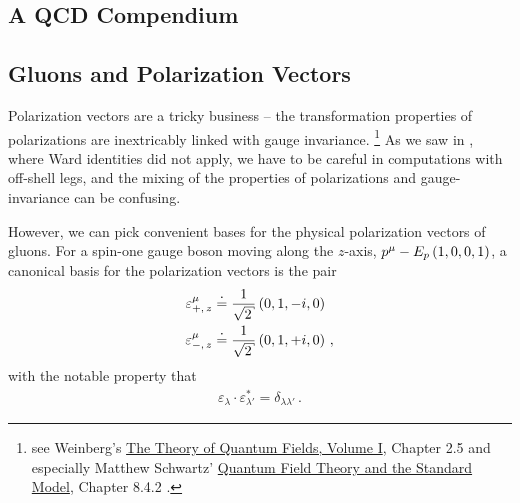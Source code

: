 \begin{subappendices}


\section{A QCD Compendium}
\label{app:qcd-compendium}

\subsection{Gluons and Polarization Vectors}

Polarization vectors are a tricky business -- the transformation properties of polarizations are inextricably linked with gauge invariance.%
\footnote{
    see Weinberg's \underline{The Theory of Quantum Fields, Volume I}, Chapter 2.5 \cite{Weinberg:1995mt} and especially Matthew Schwartz' \underline{Quantum Field Theory and the Standard Model}, Chapter 8.4.2 \cite{Schwartz:2014sze}.
}
%
As we saw in , where Ward identities did not apply, we have to be careful in computations with off-shell legs, and the mixing of the properties of polarizations and gauge-invariance can be confusing.

However, we can pick convenient bases for the physical polarization vectors of gluons.
%
For a spin-one gauge boson moving along the \(z\)-axis, \(p^\mu - E_p \left(1,0,0,1\right)\), a canonical basis for the polarization vectors is the pair
\begin{subequations}
\label{eq:z-polarization}
\begin{align}
    \varepsilon^\mu_{+,\,z}
    &\reppedby
    \frac{1}{\sqrt{2}}
    \le(0, 1, -i, 0\ri)
    \\
    \varepsilon^\mu_{-,\,z}
    &\reppedby
    \frac{1}{\sqrt{2}}
    \le(0, 1, +i, 0\ri)
    \,,
\end{align}
\end{subequations}
with the notable property that
\begin{align}
    \varepsilon_\lambda \cdot \varepsilon_{\lambda'}^*
    =
    \delta_{\lambda \lambda'}
    \,.
\end{align}



\end{subappendices}
